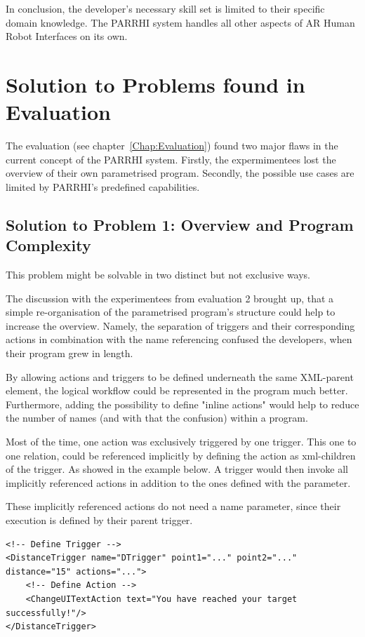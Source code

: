 In conclusion, the developer's necessary skill set is limited to their specific domain knowledge. The PARRHI system handles all other aspects of AR Human Robot Interfaces on its own.

\section{Solution to Problems found in Evaluation}\label{Section:SolutionToEval}

The evaluation (see chapter~\ref{Chap:Evaluation}) found two major flaws in the current concept of the PARRHI system. Firstly, the expermimentees lost the overview of their own parametrised program. Secondly, the possible use cases are limited by PARRHI's predefined capabilities.

\subsection{Solution to Problem 1: Overview and Program Complexity}
This problem might be solvable in two distinct but not exclusive ways.

The discussion with the experimentees from evaluation 2 brought up, that a simple re-organisation of the parametrised program's structure could help to increase the overview. Namely, the separation of triggers and their corresponding actions in combination with the name referencing confused the developers, when their program grew in length.

By allowing actions and triggers to be defined underneath the same XML-parent element, the logical workflow could be represented in the program much better. Furthermore, adding the possibility to define "inline actions" would help to reduce the number of names (and with that the confusion) within a program.

Most of the time, one action was exclusively triggered by one trigger. This one to one relation, could be referenced implicitly by defining the action as xml-children of the trigger. As showed in the example below. A trigger would then invoke all implicitly referenced actions in addition to the ones defined with the  parameter.

These implicitly referenced actions do not need a name parameter, since their execution is defined by their parent trigger.

\begin{lstlisting}
<!-- Define Trigger -->
<DistanceTrigger name="DTrigger" point1="..." point2="..." distance="15" actions="...">
	<!-- Define Action -->
	<ChangeUITextAction text="You have reached your target successfully!"/>
</DistanceTrigger>
\end{lstlisting}

